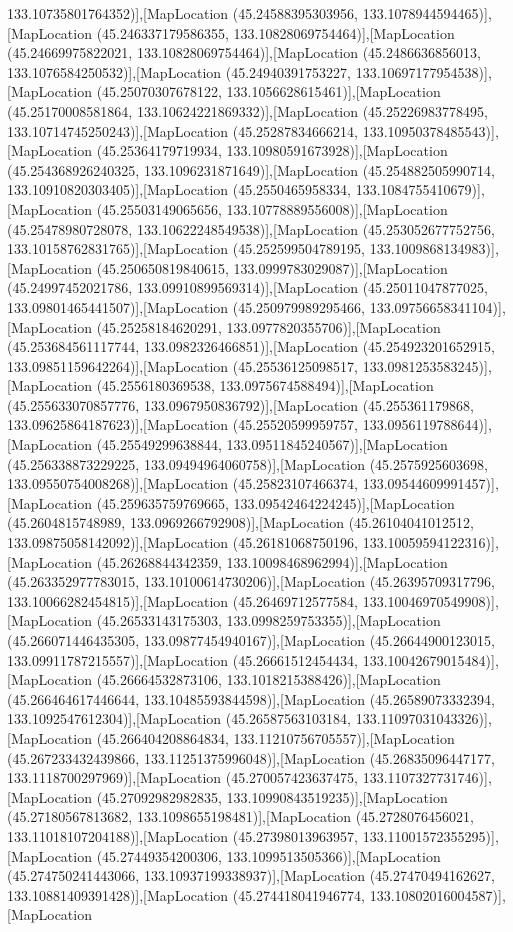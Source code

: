 133.10735801764352)],[MapLocation (45.24588395303956, 133.1078944594465)],[MapLocation (45.246337179586355, 133.10828069754464)],[MapLocation (45.24669975822021, 133.10828069754464)],[MapLocation (45.2486636856013, 133.1076584250532)],[MapLocation (45.24940391753227, 133.10697177954538)],[MapLocation (45.25070307678122, 133.1056628615461)],[MapLocation (45.25170008581864, 133.10624221869332)],[MapLocation (45.25226983778495, 133.10714745250243)],[MapLocation (45.25287834666214, 133.10950378485543)],[MapLocation (45.25364179719934, 133.10980591673928)],[MapLocation (45.254368926240325, 133.1096231871649)],[MapLocation (45.254882505990714, 133.10910820303405)],[MapLocation (45.2550465958334, 133.1084755410679)],[MapLocation (45.25503149065656, 133.10778889556008)],[MapLocation (45.25478980728078, 133.10622248549538)],[MapLocation (45.253052677752756, 133.10158762831765)],[MapLocation (45.252599504789195, 133.1009868134983)],[MapLocation (45.250650819840615, 133.0999783029087)],[MapLocation (45.24997452021786, 133.09910899569314)],[MapLocation (45.25011047877025, 133.09801465441507)],[MapLocation (45.250979989295466, 133.09756658341104)],[MapLocation (45.25258184620291, 133.0977820355706)],[MapLocation (45.253684561117744, 133.0982326466851)],[MapLocation (45.254923201652915, 133.09851159642264)],[MapLocation (45.25536125098517, 133.0981253583245)],[MapLocation (45.2556180369538, 133.0975674588494)],[MapLocation (45.255633070857776, 133.0967950836792)],[MapLocation (45.255361179868, 133.09625864187623)],[MapLocation (45.25520599959757, 133.0956119788644)],[MapLocation (45.25549299638844, 133.09511845240567)],[MapLocation (45.256338873229225, 133.09494964060758)],[MapLocation (45.2575925603698, 133.09550754008268)],[MapLocation (45.25823107466374, 133.09544609991457)],[MapLocation (45.259635759769665, 133.09542464224245)],[MapLocation (45.2604815748989, 133.0969266792908)],[MapLocation (45.26104041012512, 133.09875058142092)],[MapLocation (45.26181068750196, 133.10059594122316)],[MapLocation (45.26268844342359, 133.10098468962994)],[MapLocation (45.263352977783015, 133.10100614730206)],[MapLocation (45.26395709317796, 133.10066282454815)],[MapLocation (45.26469712577584, 133.10046970549908)],[MapLocation (45.26533143175303, 133.0998259753355)],[MapLocation (45.266071446435305, 133.09877454940167)],[MapLocation (45.26644900123015, 133.09911787215557)],[MapLocation (45.26661512454434, 133.10042679015484)],[MapLocation (45.26664532873106, 133.1018215388426)],[MapLocation (45.266464617446644, 133.10485593844598)],[MapLocation (45.26589073332394, 133.1092547612304)],[MapLocation (45.26587563103184, 133.11097031043326)],[MapLocation (45.266404208864834, 133.11210756705557)],[MapLocation (45.267233432439866, 133.11251375996048)],[MapLocation (45.26835096447177, 133.1118700297969)],[MapLocation (45.270057423637475, 133.1107327731746)],[MapLocation (45.27092982982835, 133.10990843519235)],[MapLocation (45.27180567813682, 133.1098655198481)],[MapLocation (45.2728076456021, 133.11018107204188)],[MapLocation (45.27398013963957, 133.11001572355295)],[MapLocation (45.27449354200306, 133.1099513505366)],[MapLocation (45.274750241443066, 133.10937199338937)],[MapLocation (45.27470494162627, 133.10881409391428)],[MapLocation (45.274418041946774, 133.10802016004587)],[MapLocation 